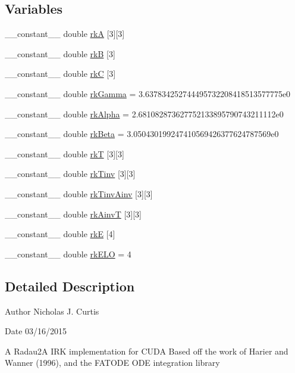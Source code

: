 \subsection*{Variables}
\begin{DoxyCompactItemize}
\item 
\+\_\+\+\_\+constant\+\_\+\+\_\+ double \hyperlink{radau2a_8cu_a0d840116f693430ce6f2ef4d39a4242e}{rkA} \mbox{[}3\mbox{]}\mbox{[}3\mbox{]}
\item 
\+\_\+\+\_\+constant\+\_\+\+\_\+ double \hyperlink{radau2a_8cu_af1b7e1e9dccdd6c67471dcc6574bbec9}{rkB} \mbox{[}3\mbox{]}
\item 
\+\_\+\+\_\+constant\+\_\+\+\_\+ double \hyperlink{radau2a_8cu_aad43fe540a71483ff469d059a7a2ae47}{rkC} \mbox{[}3\mbox{]}
\item 
\+\_\+\+\_\+constant\+\_\+\+\_\+ double \hyperlink{radau2a_8cu_a1fe408f1f4381de0ba7cc7711ece69b3}{rk\+Gamma} = 3.\+637834252744495732208418513577775e0
\item 
\+\_\+\+\_\+constant\+\_\+\+\_\+ double \hyperlink{radau2a_8cu_abcf1cc253cb759bea409e311551ad323}{rk\+Alpha} = 2.\+681082873627752133895790743211112e0
\item 
\+\_\+\+\_\+constant\+\_\+\+\_\+ double \hyperlink{radau2a_8cu_a5b10ed992eb38da8c2514a77f18d6b1f}{rk\+Beta} = 3.\+050430199247410569426377624787569e0
\item 
\+\_\+\+\_\+constant\+\_\+\+\_\+ double \hyperlink{radau2a_8cu_a23863b2377430f09acb8523df5be7c3a}{rkT} \mbox{[}3\mbox{]}\mbox{[}3\mbox{]}
\item 
\+\_\+\+\_\+constant\+\_\+\+\_\+ double \hyperlink{radau2a_8cu_a0544fa464c96867fbe9b2db33c118361}{rk\+Tinv} \mbox{[}3\mbox{]}\mbox{[}3\mbox{]}
\item 
\+\_\+\+\_\+constant\+\_\+\+\_\+ double \hyperlink{radau2a_8cu_a954ecd55208794555a1cd474035c742f}{rk\+Tinv\+Ainv} \mbox{[}3\mbox{]}\mbox{[}3\mbox{]}
\item 
\+\_\+\+\_\+constant\+\_\+\+\_\+ double \hyperlink{radau2a_8cu_a19d86e17b8ed62af599db196b69c1b7a}{rk\+AinvT} \mbox{[}3\mbox{]}\mbox{[}3\mbox{]}
\item 
\+\_\+\+\_\+constant\+\_\+\+\_\+ double \hyperlink{radau2a_8cu_a737d65e39448a261886c48517d9bb0b0}{rkE} \mbox{[}4\mbox{]}
\item 
\+\_\+\+\_\+constant\+\_\+\+\_\+ double \hyperlink{radau2a_8cu_a4a47a5c2b6246610bacf303f65dc5010}{rk\+E\+LO} = 4
\end{DoxyCompactItemize}


\subsection{Detailed Description}
\begin{DoxyAuthor}{Author}
Nicholas J. Curtis 
\end{DoxyAuthor}
\begin{DoxyDate}{Date}
03/16/2015
\end{DoxyDate}
A Radau2A I\+RK implementation for C\+U\+DA Based off the work of Harier and Wanner (1996), and the F\+A\+T\+O\+DE O\+DE integration library

